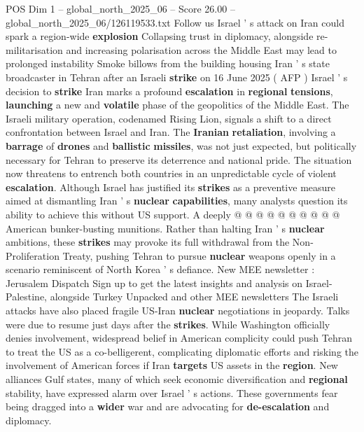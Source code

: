 \begin{textsample}{POS Dim 1 – global\_north\_2025\_06 – Score 26.00 – global\_north\_2025\_06/126119533.txt}  \label{ex:f1_pos_331}
Follow us Israel ' s attack on Iran could spark a region-wide \textbf{explosion} Collapsing trust in diplomacy, alongside re-militarisation and increasing polarisation across the Middle East may lead to prolonged instability Smoke billows from the building housing Iran ' s state broadcaster in Tehran after an Israeli \textbf{strike} on 16 June 2025 ( AFP ) Israel ' s decision to \textbf{strike} Iran marks a profound \textbf{escalation} in \textbf{regional} \textbf{tensions}, \textbf{launching} a new and \textbf{volatile} phase of the geopolitics of the Middle East.
The Israeli military operation, codenamed Rising Lion, signals a shift to a direct confrontation between Israel and Iran.
The \textbf{Iranian} \textbf{retaliation}, involving a \textbf{barrage} of \textbf{drones} and \textbf{ballistic} \textbf{missiles}, was not just expected, but politically necessary for Tehran to preserve its deterrence and national pride.
The situation now threatens to entrench both countries in an unpredictable cycle of violent \textbf{escalation}.
Although Israel has justified its \textbf{strikes} as a preventive measure aimed at dismantling Iran ' s \textbf{nuclear} \textbf{capabilities}, many analysts question its ability to achieve this without US support.
A deeply @ @ @ @ @ @ @ @ @ @ American bunker-busting munitions.
Rather than halting Iran ' s \textbf{nuclear} ambitions, these \textbf{strikes} may provoke its full withdrawal from the Non-Proliferation Treaty, pushing Tehran to pursue \textbf{nuclear} weapons openly in a scenario reminiscent of North Korea ' s defiance.
New MEE newsletter : Jerusalem Dispatch Sign up to get the latest insights and analysis on Israel-Palestine, alongside Turkey Unpacked and other MEE newsletters The Israeli attacks have also placed fragile US-Iran \textbf{nuclear} negotiations in jeopardy.
Talks were due to resume just days after the \textbf{strikes}.
While Washington officially denies involvement, widespread belief in American complicity could push Tehran to treat the US as a co-belligerent, complicating diplomatic efforts and risking the involvement of American forces if Iran \textbf{targets} US assets in the \textbf{region}.
New alliances Gulf states, many of which seek economic diversification and \textbf{regional} stability, have expressed alarm over Israel ' s actions.
These governments fear being dragged into a \textbf{wider} war and are advocating for \textbf{de-escalation} and diplomacy.

\end{textsample}
